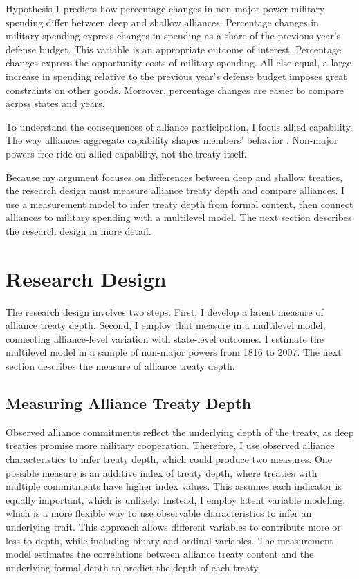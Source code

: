 \documentclass[12pt]{article}
\begin{document}
Hypothesis 1 predicts how percentage changes in non-major power military spending differ between deep and shallow alliances. 
Percentage changes in military spending express changes in spending as a share of the previous year's defense budget.
This variable is an appropriate outcome of interest. 
Percentage changes express the opportunity costs of military spending. 
All else equal, a large increase in spending relative to the previous year's defense budget imposes great constraints on other goods. 
Moreover, percentage changes are easier to compare across states and years. 


To understand the consequences of alliance participation, I focus allied capability.
The way alliances aggregate capability shapes members' behavior \citep{FordhamPoast2014}. 
Non-major powers free-ride on allied capability, not the treaty itself. 


Because my argument focuses on differences between deep and shallow treaties, the research design must measure alliance treaty depth and compare alliances.  
I use a measurement model to infer treaty depth from formal content, then connect alliances to military spending with a multilevel model. 
The next section describes the research design in more detail. 



\section{Research Design} 


The research design involves two steps. 
First, I develop a latent measure of alliance treaty depth. 
Second, I employ that measure in a multilevel model, connecting alliance-level variation with state-level outcomes. 
I estimate the multilevel model in a sample of non-major powers from 1816 to 2007. 
The next section describes the measure of alliance treaty depth. 


\subsection{Measuring Alliance Treaty Depth} 


Observed alliance commitments reflect the underlying depth of the treaty, as deep treaties promise more military cooperation. 
Therefore, I use observed alliance characteristics to infer treaty depth, which could produce two measures. 
One possible measure is an additive index of treaty depth, where treaties with multiple commitments have higher index values. 
This assumes each indicator is equally important, which is unlikely. 
Instead, I employ latent variable modeling, which is a more flexible way to use observable characteristics to infer an underlying trait. 
This approach allows different variables to contribute more or less to depth, while including binary and ordinal variables.  
The measurement model estimates the correlations between alliance treaty content and the underlying formal depth to predict the depth of each treaty. 
\end{document}
